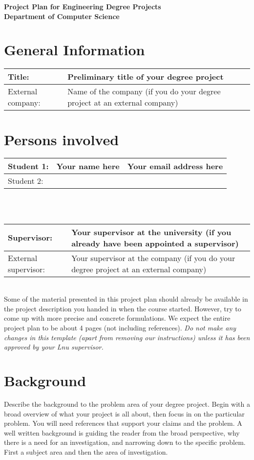 \documentclass[12pt]{article}
\begin{document}
\begin{center}
\Large \textbf{Project Plan for Engineering Degree Projects } \\
\large \textbf{Department of Computer Science}
\end{center}

\section*{General Information}
\begin{tabular} {|p{3.8cm}|p{9cm}|} \hline
Title: & Preliminary title of your degree project \\ \hline
External company: & Name of the company (if you do your degree project at an external company) \\ \hline
\end{tabular}

\section*{Persons involved}
\begin{tabular} {|p{2.2cm}|p{4.7cm}|p{5.47cm}|} \hline
Student 1: & Your name here & Your email address here \\ \hline
Student 2: &  &  \\ \hline
\end{tabular}
\\ \vspace*{0.2cm} \\
\begin{tabular} {|p{3.9cm}|p{8.9cm}|} \hline
Supervisor: & Your supervisor at the university (if you already have been appointed a supervisor) \\ \hline
External supervisor: & Your supervisor at the company (if you do your degree project at an external company) \\ \hline
\end{tabular}
\\


Some of the material presented in this project plan should already be available in the project description you handed in when the course started. However, try to come up with more precise and concrete formulations. We expect the entire project plan to be about 4 pages (not including references). \textit{Do not make any changes in this template (apart from removing our instructions) unless it has been approved by your Lnu supervisor. }

\section*{Background}
Describe the background to the problem area of your degree project. Begin with a broad overview of what your 
project is all about, then focus in on the particular problem. You will need references that support your claims 
and the problem. A well written background is guiding the reader from the broad perspective, why there is a need 
for an investigation, and narrowing down to the specific problem. First a subject area and then the area of investigation.
\end{document}
